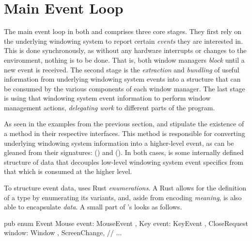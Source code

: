 \section{Main Event Loop}

The main event loop in both \wmrs and \wmcpp comprises three core stages. They
first rely on the underlying windowing system to report certain \textit{events}
they are interested in. This is done synchronously, as without any hardware
interrupts or changes to the environment, nothing is to be done. That is,
both window managers \textit{block} until a new event is received. The second
stage is the \textit{extraction} and \textit{bundling} of useful information
from underlying windowing system events into a structure that can be consumed
by the various components of each window manager. The last stage is using
that windowing system event information to perform window management actions,
\textit{delegating work} to different parts of the program.


As seen in the examples from the previous section, \wmrs and \wmcpp stipulate
the existence of a  method in their respective 
interfaces. This method is responsible for converting underlying windowing
system information into a higher-level event, as can be gleaned from their
signatures:  (\wmrs) and  (\wmcpp). In both cases,  is some internally defined
structure of data that decouples low-level windowing system event specifics from
that which is consumed at the higher level.



To structure event data, \wmrs uses Rust \textit{enumerations}. A Rust
 allows for the definition of a type by enumerating its variants,
and, aside from encoding \textit{meaning}, is also able to encapsulate
\textit{data}\cite{therustbook}. A small part of \wmrs's 
 looks as follows.

\begin{rustblock}
  pub enum Event {
    Mouse { event: MouseEvent },
    Key { event: KeyEvent },
    CloseRequest { window: Window },
    ScreenChange,
    // ...
  }
\end{rustblock}


